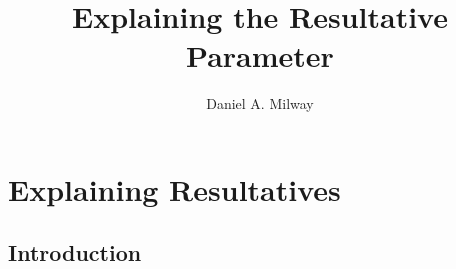\documentclass[
	draft,
	12pt,
	twoside,
	narrowmargins
	]{ut-thesis}
\author{Daniel A. Milway}
\title{Explaining the Resultative Parameter}
\theoremstyle{definition}
\begin{document}
\begin{preliminary}
  \maketitle
  \tableofcontents
  \listoftables
  \listoffigures
  \listoftheorems[ignoreall,show={defn}]
\end{preliminary}
\part{Explaining Resultatives}\label{sec:part1}
\chapter{Introduction}


%
%
\end{document}
